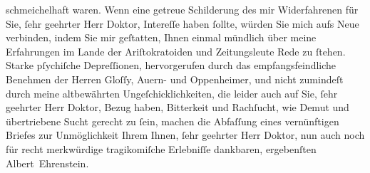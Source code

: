 \begin{ledgroupsized}[t]{13cm}
               schmeichelhaft waren. Wenn eine getreue Schilderung des mir Widerfahrenen für Sie,
               ſehr geehrter Herr Doktor, Intereſſe haben ſollte, würden Sie mich aufs Neue
               verbinden, indem Sie mir geſtatten, Ihnen einmal mündlich über meine Erfahrungen im
               Lande der Ariſtokratoiden und Zeitungsleute Rede zu ſtehen. Starke pſychiſche
               Depreſſionen, hervorgerufen durch das empfangsfeindliche Benehmen der Herren Gloſſy, Auern-
               und Oppenheimer, und {\pb}nicht zumindeſt durch meine altbewährten
               Ungeſchicklichkeiten, die leider auch auf Sie, ſehr geehrter Herr Doktor, Bezug
               haben, Bitterkeit und Rachſucht, wie Demut und übertriebene Sucht gerecht zu ſein,
               machen die Abfaſſung eines vernünftigen Briefes zur Unmöglichkeit Ihrem Ihnen, ſehr
               geehrter Herr Doktor, nun auch noch für recht merkwürdige tragikomiſche Erlebniſſe
               dankbaren, ergebenſten\pend
           \pstart \spacefill\mbox{Albert Ehrenstein.}\pend{}
         
         \endnumbering{}\end{ledgroupsized}  \newcommand{\dateiname}{L01835}\newcommand{\titel}{Albert Ehrenstein an Arthur Schnitzler, 27. 3. 1909}\newcommand{\editorInnen}{Martin Anton Müller und Gerd-Hermann Susen}
      